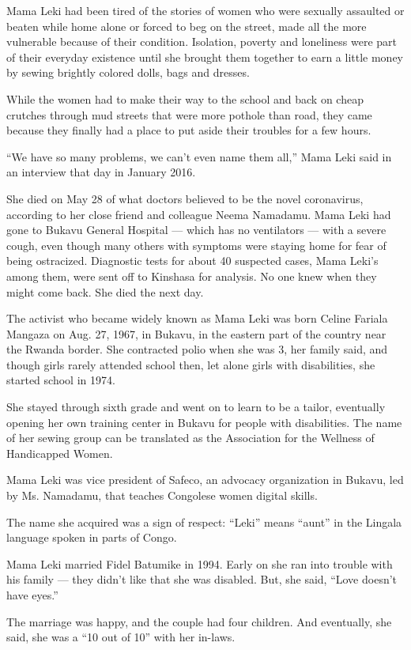 Mama Leki had been tired of the stories of women who were sexually
assaulted or beaten while home alone or forced to beg on the street,
made all the more vulnerable because of their condition. Isolation,
poverty and loneliness were part of their everyday existence until she
brought them together to earn a little money by sewing brightly colored
dolls, bags and dresses.

While the women had to make their way to the school and back on cheap
crutches through mud streets that were more pothole than road, they came
because they finally had a place to put aside their troubles for a few
hours.

``We have so many problems, we can't even name them all,'' Mama Leki
said in an interview that day in January 2016.

She died on May 28 of what doctors believed to be the novel coronavirus,
according to her close friend and colleague Neema Namadamu. Mama Leki
had gone to Bukavu General Hospital --- which has no ventilators ---
with a severe cough, even though many others with symptoms were staying
home for fear of being ostracized. Diagnostic tests for about 40
suspected cases, Mama Leki's among them, were sent off to Kinshasa for
analysis. No one knew when they might come back. She died the next day.

The activist who became widely known as Mama Leki was born Celine
Fariala Mangaza on Aug. 27, 1967, in Bukavu, in the eastern part of the
country near the Rwanda border. She contracted polio when she was 3, her
family said, and though girls rarely attended school then, let alone
girls with disabilities, she started school in 1974.

She stayed through sixth grade and went on to learn to be a tailor,
eventually opening her own training center in Bukavu for people with
disabilities. The name of her sewing group can be translated as the
Association for the Wellness of Handicapped Women.

Mama Leki was vice president of Safeco, an advocacy organization in
Bukavu, led by Ms. Namadamu, that teaches Congolese women digital
skills.

The name she acquired was a sign of respect: ``Leki'' means ``aunt'' in
the Lingala language spoken in parts of Congo.

Mama Leki married Fidel Batumike in 1994. Early on she ran into trouble
with his family --- they didn't like that she was disabled. But, she
said, ``Love doesn't have eyes.''

The marriage was happy, and the couple had four children. And
eventually, she said, she was a ``10 out of 10'' with her in-laws.

